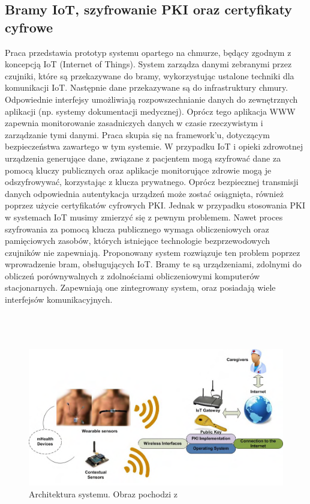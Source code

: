 \subsection{Bramy IoT, szyfrowanie PKI oraz certyfikaty cyfrowe \cite{6399701}}
Praca przedstawia prototyp systemu opartego na chmurze, będący zgodnym z koncepcją IoT (Internet of Things). System zarządza danymi zebranymi przez czujniki, które są przekazywane do bramy, wykorzystując ustalone techniki dla komunikacji IoT. Następnie dane przekazywane są do infrastruktury chmury. Odpowiednie interfejsy umożliwiają rozpowszechnianie danych do zewnętrznych aplikacji (np. systemy dokumentacji medycznej). Oprócz tego aplikacja WWW zapewnia monitorowanie zasadniczych danych w czasie rzeczywistym i zarządzanie tymi danymi. Praca skupia się na framework'u, dotyczącym bezpieczeństwa zawartego w tym systemie. 
W przypadku IoT i opieki zdrowotnej urządzenia generujące dane, związane z pacjentem mogą szyfrować dane za pomocą kluczy publicznych oraz aplikacje monitorujące zdrowie mogą je odszyfrowywać, korzystając z klucza prywatnego. Oprócz bezpiecznej transmisji danych odpowiednia autentykacja urządzeń może zostać osiągnięta, również poprzez użycie certyfikatów cyfrowych PKI. Jednak w przypadku stosowania PKI w systemach IoT musimy zmierzyć się z pewnym problemem. Nawet proces szyfrowania za pomocą klucza publicznego wymaga obliczeniowych oraz pamięciowych zasobów, których istniejące technologie bezprzewodowych czujników nie zapewniają. Proponowany system rozwiązuje ten problem poprzez wprowadzenie bram, obsługujących IoT. Bramy te są urządzeniami, zdolnymi do obliczeń porównywalnych z zdolnościami obliczeniowymi komputerów stacjonarnych. Zapewniają one zintegrowany system, oraz posiadają wiele interfejsów komunikacyjnych. \\ \\ \\ \\

\begin{figure}[h!]
	\centering
		\includegraphics[scale=0.6]{Enabling_Data_Protection_through_PKI_encryption_in_IoT_m-Health_Devices_fig1}
	\caption{Architektura systemu. Obraz pochodzi z \cite{6399701}}
\end{figure}


